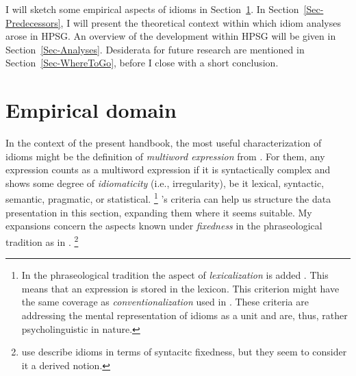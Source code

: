 \documentclass[output=paper]{langsci/langscibook}
\begin{document}
I will sketch some empirical aspects of idioms in Section~\ref{Sec-EmpiricalDomain}.
In Section~\ref{Sec-Predecessors}, I will present the theoretical context within which idiom analyses arose in HPSG.
An overview of the development within HPSG will be given in Section~\ref{Sec-Analyses}. 
Desiderata for future research are mentioned in Section~\ref{Sec-WhereToGo}, before I close with a short conclusion.

\section{Empirical domain}
\label{Sec-EmpiricalDomain}


In the context of the present handbook, the most useful characterization of idioms might be the definition of \emph{multiword expression} from \cite{Baldwin:Kim:10}.
For them, any expression counts as a multiword expression if it is syntactically complex and shows some degree of \emph{idiomaticity} (i.e., irregularity), be it lexical, syntactic, semantic, pragmatic, or statistical.%
\footnote{In the phraseological tradition the aspect of \emph{lexicalization} is added \citep{Fleischer97a-u,Burger:98}. This means that an expression is stored in the lexicon. This criterion might have the same coverage as \emph{conventionalization} used in \cite{NSW94a}. 
These criteria are addressing the mental representation of idioms as a unit and are, thus, rather psycholinguistic in nature.}
%
\citeauthor{Baldwin:Kim:10}'s criteria can help us structure the data presentation in this section, expanding them where it seems suitable.
My expansions concern the aspects known under \emph{fixedness} in the phraseological tradition as in \cite{Fleischer97a-u}.%
\footnote{\cite{Baldwin:Kim:10} use describe idioms in terms of syntacitc fixedness, but they seem to consider it a derived notion.}
\end{document}
